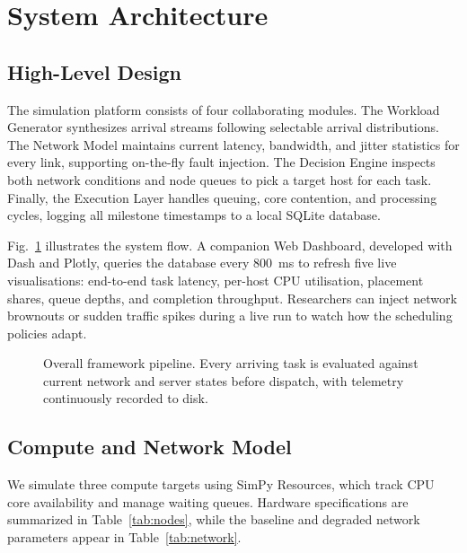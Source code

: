\documentclass[conference]{IEEEtran}
\begin{document}
\section{System Architecture}
\label{sec:arch}

\subsection{High-Level Design}
The simulation platform consists of four collaborating modules. The Workload Generator synthesizes arrival streams following selectable arrival distributions. The Network Model maintains current latency, bandwidth, and jitter statistics for every link, supporting on-the-fly fault injection. The Decision Engine inspects both network conditions and node queues to pick a target host for each task. Finally, the Execution Layer handles queuing, core contention, and processing cycles, logging all milestone timestamps to a local SQLite database.

Fig.~\ref{fig:arch} illustrates the system flow. A companion Web Dashboard, developed with Dash and Plotly, queries the database every 800~ms to refresh five live visualisations: end-to-end task latency, per-host CPU utilisation, placement shares, queue depths, and completion throughput. Researchers can inject network brownouts or sudden traffic spikes during a live run to watch how the scheduling policies adapt.

\begin{figure}[h]
\centering
{}
\caption{Overall framework pipeline. Every arriving task is evaluated against current network and server states before dispatch, with telemetry continuously recorded to disk.}
\label{fig:arch}
\end{figure}

\subsection{Compute and Network Model}
We simulate three compute targets using SimPy Resources, which track CPU core availability and manage waiting queues. Hardware specifications are summarized in Table~\ref{tab:nodes}, while the baseline and degraded network parameters appear in Table~\ref{tab:network}.
\end{document}
